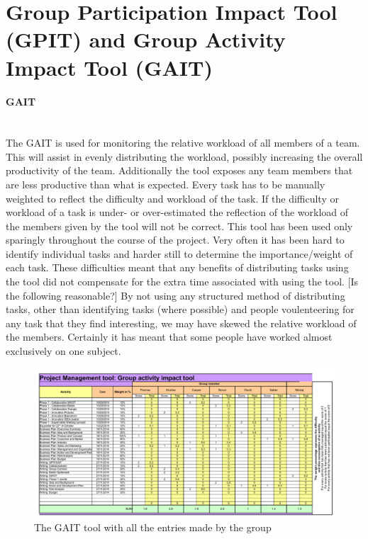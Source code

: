 \section{ \textbf{G}roup \textbf{P}articipation \textbf{I}mpact \textbf{T}ool (GPIT) and \textbf{G}roup \textbf{A}ctivity \textbf{I}mpact \textbf{T}ool (GAIT)}
\paragraph*{GAIT}~\\
The GAIT is used for monitoring the relative workload of all members of a team. This will assist in evenly distributing the workload, possibly increasing the overall productivity of the team. Additionally the tool exposes any team members that are less productive than what is expected. Every task has to be manually weighted to reflect the difficulty and workload of the task. If the difficulty or workload of a task is under- or over-estimated the reflection of the workload of the members given by the tool will not be correct.
This tool has been used only sparingly throughout the course of the project. Very often it has been hard to identify individual tasks and harder still to determine the importance/weight of each task. These difficulties meant that any benefits of distributing tasks using the tool did not compensate for the extra time associated with using the tool. 
[Is the following reasonable?] By not using any structured method of distributing tasks, other than identifying tasks (where possible) and people voulenteering for any task that they find interesting, we may have skewed the relative workload of the members. Certainly it has meant that some people have worked almost exclusively on one subject.
\begin{landscape}
	\begin{figure}[h!]
		\label{fig:GAIT}
		\includegraphics[scale=1.25]{./graphics/GAIT}
		\caption{The GAIT tool with all the entries made by the group}
	\end{figure}
\end{landscape}
